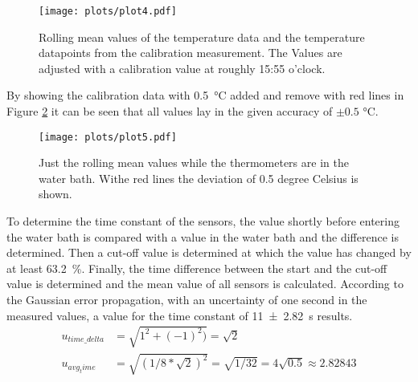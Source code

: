 \begin{figure}
    \centering 
    \texttt{[image: plots/plot4.pdf]}
    \caption{Rolling mean values of the temperature data and the temperature datapoints from the calibration measurement. The Values are adjusted with a calibration value at roughly 15:55 o'clock.}
    \label{fig:plot4}
\end{figure}
By showing the calibration data with \SI{0.5}{\celsius} added and remove with red lines in Figure \ref{fig:plot5} it can be seen that all values lay in the given accuracy of $\pm 0.5$ \si{\celsius}.\\

\begin{figure}
    \centering 
    \texttt{[image: plots/plot5.pdf]}
    \caption{Just the rolling mean values while the thermometers are in the water bath. Withe red lines the deviation of 0.5 degree Celsius is shown.}
    \label{fig:plot5}
\end{figure}
To determine the time constant of the sensors, the value shortly before entering the water bath is compared with a value in the water bath and the difference is determined.
Then a cut-off value is determined at which the value has changed by at least \SI{63.2}{\percent}.
Finally, the time difference between the start and the cut-off value is determined and the mean value of all sensors is calculated.
According to the Gaussian error propagation, with an uncertainty of one second in the measured values, a value for the time constant of \SI{11(2.82)}{\second} results.
\begin{align}
    u_{time\_delta} &= \sqrt{1^2+(-1)^2)} = \sqrt{2}\\
    u_{avg_time} &= \sqrt{(1/8*\sqrt{2})^2} = \sqrt{1/32} = 4\sqrt{0.5} ≈ 2.82843
\end{align}